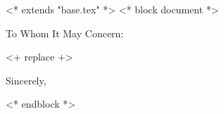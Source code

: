 <* extends "base.tex" *>
<* block document *>
\signature{<+ user.name +>}
\address{<+ user.full_address | replace("\n","\\\\") +>}


\begin{letter}{\recipientaddress}
\opening{To Whom It May Concern:}

<+ replace +>
\closing{Sincerely,}

\end{letter}

<* endblock *>

